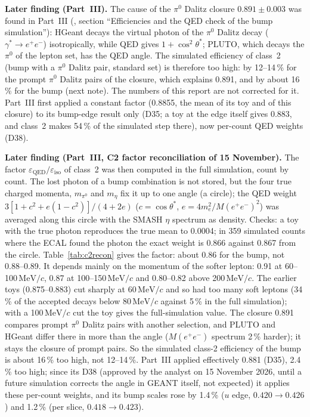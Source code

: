 \documentclass[11pt,a4paper]{article}
\newcommand{\piz}{\ensuremath{\pi^{0}}\xspace}
\newcommand{\ee}{\ensuremath{e^{+}e^{-}}\xspace}
\newcommand{\Mee}{\ensuremath{M(e^{+}e^{-})}\xspace}
\newcommand{\MeVc}{\ensuremath{\mathrm{MeV}/c}\xspace}
\newcommand{\code}[1]{\texttt{\detokenize{#1}}}
\newcommand{\notebox}[1]{\par\noindent\colorbox{orange!10}{\parbox{\dimexpr\linewidth-2\fboxsep\relax}{#1}}\par}
\begin{document}
\notebox{\textbf{Later finding (Part~III).} The cause of the \piz Dalitz closure $0.891\pm0.003$ was found in
Part~III (\code{report_all.pdf}, section ``Efficiencies and the QED check of the bump simulation''): HGeant decays
the virtual photon of the \piz Dalitz decay ($\gamma^*\to\ee$) isotropically, while QED gives $1+\cos^2\theta^*$;
PLUTO, which decays the \piz of the lepton set, has the QED angle. The simulated efficiency of class~2 (bump with a
\piz Dalitz pair, standard set) is therefore too high: by 12--14\,\% for the prompt \piz Dalitz pairs of the closure, which
explains 0.891, and by about 16\,\% for the bump (next note). The numbers of this report are not corrected for it. Part~III
first applied a constant factor (0.8855, the mean of its toy and of this closure) to its bump-edge result only (D35; a toy
at the edge itself gives 0.883, and class~2 makes 54\,\% of the simulated step there), now per-count QED weights (D38).}

\notebox{\textbf{Later finding (Part~III, C2 factor reconciliation of 15 November).} The factor
$\varepsilon_{\mathrm{QED}}/\varepsilon_{\mathrm{iso}}$ of class~2 was then computed in the full simulation, count by count.
The lost photon of a bump combination is not stored, but the four true charged momenta, $m_{\piz}$ and $m_\eta$ fix it up to one
angle (a circle); the QED weight $3[1+c^2+e(1-c^2)]/(4+2e)$ ($c=\cos\theta^*$, $e=4m_e^2/\Mee^2$) was averaged along this
circle with the SMASH $\eta$ spectrum as density. Checks: a toy with the true photon reproduces the true mean to 0.0004;
in 359 simulated counts where the ECAL found the photon the exact weight is 0.866 against 0.867 from the circle.
Table~\ref{tab:c2recon} gives the factor: about 0.86 for the bump, not 0.88--0.89. It depends mainly on the momentum of
the softer lepton: 0.91 at 60--100\,\MeVc, 0.87 at 100--150\,\MeVc and 0.80--0.82 above 200\,\MeVc. The earlier toys
(0.875--0.883) cut sharply at 60\,\MeVc and so had too many soft leptons (34\,\% of the accepted decays below 80\,\MeVc
against 5\,\% in the full simulation); with a 100\,\MeVc cut the toy gives the full-simulation value. The closure 0.891
compares prompt \piz Dalitz pairs with another selection, and PLUTO and HGeant differ there in more than the angle (\Mee
spectrum 2\,\% harder); it stays the closure of prompt pairs. So the simulated class-2 efficiency of the bump is about
16\,\% too high, not 12--14\,\%. Part~III applied effectively 0.881 (D35), 2.4\,\% too high; since its D38 (approved by the
analyst on 15 November 2026, until a future simulation corrects the angle in GEANT itself, not expected) it applies these
per-count weights, and its bump scales rose by 1.4\,\% ($u$ edge, $0.420\to0.426$) and 1.2\,\% (per slice, $0.418\to0.423$).}
\end{document}
